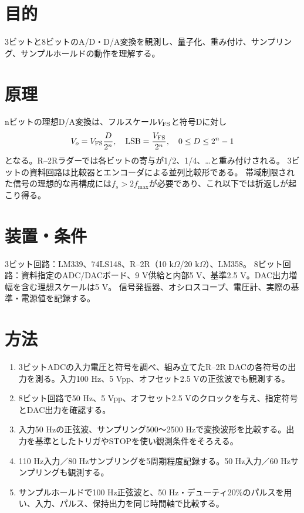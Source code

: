 \documentclass[lualatex,a4paper,10pt]{jlreq}
\begin{document}
\reporttitle
{}

\section{目的}\label{sec:auto1}
3ビットと8ビットのA/D・D/A変換を観測し、量子化、重み付け、サンプリング、サンプルホールドの動作を理解する。
\section{原理}\label{sec:auto2}
nビットの理想D/A変換は、フルスケール$V_{\rm FS}$と符号Dに対し
\[
 V_o=V_{\rm FS}\frac D{2^n},\quad
 \mathrm{LSB}=\frac{V_{\rm FS}}{2^n},\quad 0\le D\le2^n-1
\]
となる。R--2Rラダーでは各ビットの寄与が1/2、1/4、…と重み付けされる。
3ビットの資料回路は比較器とエンコーダによる並列比較形である。
帯域制限された信号の理想的な再構成には$f_s>2f_{\max}$が必要であり、これ以下では折返しが起こり得る。
\section{装置・条件}\label{sec:auto3}
3ビット回路：LM339、74LS148、R--2R（10 k$\Omega$/20 k$\Omega$）、LM358。
8ビット回路：資料指定のADC/DACボード、9 V供給と内部5 V、基準2.5 V。DAC出力増幅を含む理想スケールは5 V。
信号発振器、オシロスコープ、電圧計、実際の基準・電源値を記録する。
\writing{16mm}
\section{方法}\label{sec:auto4}
\begin{enumerate}
\item 3ビットADCの入力電圧と符号を調べ、組み立てたR--2R DACの各符号の出力を測る。入力100 Hz、5 Vpp、オフセット2.5 Vの正弦波でも観測する。
\item 8ビット回路で50 Hz、5 Vpp、オフセット2.5 Vのクロックを与え、指定符号とDAC出力を確認する。
\item 入力50 Hzの正弦波、サンプリング500〜2500 Hzで変換波形を比較する。出力を基準としたトリガやSTOPを使い観測条件をそろえる。
\item 110 Hz入力／80 Hzサンプリングを5周期程度記録する。50 Hz入力／60 Hzサンプリングも観測する。
\item サンプルホールドで100 Hz正弦波と、50 Hz・デューティ20\%のパルスを用い、入力、パルス、保持出力を同じ時間軸で比較する。
\end{enumerate}
\clearpage
\end{document}
